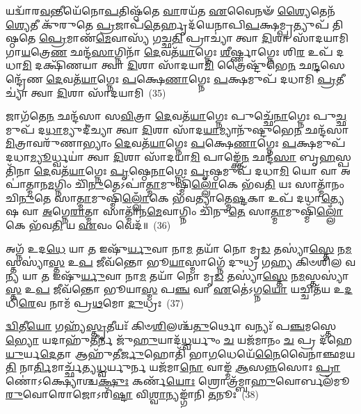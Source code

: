 𑌯𑌦𑍍𑌵𑌾᳴𑌰\-\ul{𑌵}\-𑌨𑍍𑌤𑍀𑌯𑍇᳴𑌨𑍋\-\ul{𑌪}\-𑌤𑌿𑌷𑍍𑌠᳴𑌤𑍇 \ul{𑌵𑌾}\-𑌰𑌯᳴𑌤 \ul{𑌏}\-𑌵𑍈𑌨𑍟᳴ \ul{𑌶𑍍𑌯𑍈}\-𑌤𑍇𑌨᳴ \ul{𑌶𑍍𑌯𑍇}\-𑌤𑍀 𑌕𑍁᳴𑌰𑍁𑌤𑍇 \ul{𑌪𑍍𑌰}\-𑌜𑌾𑌪᳴\-\ul{𑌤𑍇}\-𑌰𑍍\mbox{}𑌹𑍃𑌦᳴𑌯𑍇𑌨𑌾𑌪𑌿\-\ul{𑌪}\-𑌕𑍍𑌷𑌮𑍍𑌪𑍍𑌰𑌤𑍍𑌯𑍁𑌪᳴ 𑌤𑌿𑌷𑍍𑌠𑌤𑍇 \ul{𑌪𑍍𑌰𑍇}\-𑌮𑌾𑌣᳴\-\ul{𑌮𑍇}\-𑌵𑌾𑌸𑍍𑌯᳴ 𑌗𑌚𑍍𑌛\-\ul{𑌤𑌿} 𑌪𑍍𑌰𑌾𑌚𑍍𑌯𑌾॑ 𑌤𑍍𑌵𑌾 \ul{𑌦𑌿}\-𑌶𑌾 𑌸𑌾᳴𑌦𑌯𑌾𑌮𑌿 𑌗𑌾\-\ul{𑌯}\-𑌤𑍍𑌰𑍇\-\ul{𑌣} 𑌛𑌨𑍍𑌦᳴\-\ul{𑌸𑌾}\-𑌗𑍍𑌨𑌿𑌨𑌾᳴ \ul{𑌦𑍇}\-𑌵𑌤᳴\-\ul{𑌯𑌾}\-𑌗𑍍𑌨𑍇𑌃 \ul{𑌶𑍀}\-𑌰𑍍𑌷𑍍𑌣𑌾𑌗𑍍𑌨𑍇𑌃 𑌶𑌿\-\ul{𑌰} 𑌉𑌪᳴ 𑌦𑌧𑌾\-\ul{𑌮𑌿} 𑌦𑌕𑍍𑌷𑌿᳴𑌣𑌯𑌾 𑌤𑍍𑌵𑌾 \ul{𑌦𑌿}\-𑌶𑌾 𑌸𑌾᳴𑌦𑌯𑌾\-\ul{𑌮𑌿} 𑌤𑍍𑌰𑍈𑌷𑍍𑌟𑍁᳴𑌭𑍇\-\ul{𑌨} 𑌛\-\ul{𑌨𑍍𑌦}\-𑌸𑍇𑌨𑍍𑌦𑍍𑌰𑍇᳴𑌣 \ul{𑌦𑍇}\-𑌵𑌤᳴\-\ul{𑌯𑌾}\-𑌗𑍍𑌨𑍇𑌃 \ul{𑌪}\-𑌕𑍍𑌷𑍇\-\ul{𑌣𑌾}\-𑌗𑍍𑌨𑍇𑌃 \ul{𑌪}\-𑌕𑍍𑌷𑌮𑍁𑌪᳴ 𑌦𑌧𑌾𑌮𑌿 \ul{𑌪𑍍𑌰}\-𑌤𑍀𑌚𑍍𑌯𑌾॑ 𑌤𑍍𑌵𑌾 \ul{𑌦𑌿}\-𑌶𑌾 𑌸𑌾᳴𑌦𑌯𑌾𑌮𑌿~(35)

𑌜𑌾𑌗᳴𑌤𑍇\-\ul{𑌨} 𑌛𑌨𑍍𑌦᳴𑌸𑌾 𑌸\-\ul{𑌵𑌿}\-𑌤𑍍𑌰𑌾 \ul{𑌦𑍇}\-𑌵𑌤᳴\-\ul{𑌯𑌾}\-𑌗𑍍𑌨𑍇𑌃 𑌪𑍁𑌚𑍍𑌛𑍇᳴\-\ul{𑌨𑌾}\-𑌗𑍍𑌨𑍇𑌃 𑌪𑍁\-\ul{𑌚𑍍𑌛}\-𑌮𑍁𑌪᳴ 𑌦\-\ul{𑌧𑌾}\-𑌮𑍍𑌯𑍁𑌦𑍀॑𑌚𑍍𑌯𑌾 𑌤𑍍𑌵𑌾 \ul{𑌦𑌿}\-𑌶𑌾 𑌸𑌾᳴𑌦\-\ul{𑌯𑌾}\-𑌮𑍍𑌯𑌾𑌨𑍁᳴𑌷𑍍𑌟𑍁𑌭𑍇\-\ul{𑌨} 𑌛𑌨𑍍𑌦᳴𑌸𑌾 \ul{𑌮𑌿}\-𑌤𑍍𑌰𑌾𑌵𑌰𑍁᳴𑌣𑌾𑌭𑍍𑌯𑌾𑌂 \ul{𑌦𑍇}\-𑌵𑌤᳴\-\ul{𑌯𑌾}\-𑌗𑍍𑌨𑍇𑌃 \ul{𑌪}\-𑌕𑍍𑌷𑍇\-\ul{𑌣𑌾}\-𑌗𑍍𑌨𑍇𑌃 \ul{𑌪}\-𑌕𑍍𑌷𑌮𑍁𑌪᳴ 𑌦𑌧𑌾\-\ul{𑌮𑍍𑌯𑍂}\-𑌰𑍍𑌧𑍍𑌵𑌯𑌾॑ 𑌤𑍍𑌵𑌾 \ul{𑌦𑌿}\-𑌶𑌾 𑌸𑌾᳴𑌦𑌯𑌾\-\ul{𑌮𑌿} 𑌪𑌾𑌙𑍍𑌕𑍍𑌤𑍇᳴\-\ul{𑌨} 𑌛𑌨𑍍𑌦᳴\-\ul{𑌸𑌾} 𑌬𑍃\-\ul{𑌹}\-𑌸𑍍𑌪𑌤𑌿᳴𑌨𑌾 \ul{𑌦𑍇}\-𑌵𑌤᳴\-\ul{𑌯𑌾}\-𑌗𑍍𑌨𑍇𑌃 \ul{𑌪𑍃}\-𑌷𑍍𑌠𑍇\-\ul{𑌨𑌾}\-𑌗𑍍𑌨𑍇𑌃 \ul{𑌪𑍃}\-𑌷𑍍𑌠𑌮𑍁𑌪᳴ 𑌦𑌧𑌾\-\ul{𑌮𑌿} 𑌯𑍋 𑌵𑌾 𑌅𑌪𑌾॑𑌤𑍍𑌮𑌾𑌨\-\ul{𑌮}\-𑌗𑍍𑌨𑌿𑌂 𑌚𑌿᳴\-\ul{𑌨𑍁}\-𑌤𑍇\-𑌽𑌪𑌾॑\-\ul{𑌤𑍍𑌮𑌾}\-𑌮𑍁𑌷𑍍𑌮𑌿᳴\-\ul{𑌲𑍍𑌲𑍋𑌁}\-𑌕𑍇 𑌭᳴𑌵\-\ul{𑌤𑌿} 𑌯𑌃 𑌸𑌾𑌤𑍍𑌮𑌾᳴𑌨𑌂 𑌚𑌿\-\ul{𑌨𑍁}\-𑌤𑍇 𑌸𑌾\-\ul{𑌤𑍍𑌮𑌾}\-𑌮𑍁𑌷𑍍𑌮𑌿᳴\-\ul{𑌲𑍍𑌲𑍋𑌁}\-𑌕𑍇 𑌭᳴𑌵𑌤𑍍𑌯𑌾𑌤𑍍𑌮𑍇\-\ul{𑌷𑍍𑌟}\-𑌕𑌾 𑌉𑌪᳴ 𑌦𑌧𑌾\-\ul{𑌤𑍍𑌯𑍇}\-𑌷 𑌵𑌾 \ul{𑌅}\-𑌗𑍍𑌨𑍇\-\ul{𑌰𑌾}\-𑌤𑍍𑌮𑌾 𑌸𑌾𑌤𑍍𑌮𑌾᳴𑌨\-\ul{𑌮𑍇}\-𑌵𑌾𑌗𑍍𑌨𑌿𑌂 𑌚𑌿᳴𑌨𑍁\-\ul{𑌤𑍇} 𑌸𑌾\-\ul{𑌤𑍍𑌮𑌾}\-𑌮𑍁𑌷𑍍𑌮𑌿᳴\-\ul{𑌲𑍍𑌲𑍋𑌁}\-𑌕𑍇 𑌭᳴𑌵\-\ul{𑌤𑌿} 𑌯 \ul{𑌏}\-𑌵𑌂 𑌵𑍇𑌦᳴॥~(36)

{\anuvakamend[{\-\ul{𑌶𑍍𑌯𑍈}\-\-\ul{𑌤}\-𑌤𑍍𑌵𑌂 \ul{𑌪𑍍𑌰}\-𑌤𑍀𑌚𑍍𑌯𑌾॑ 𑌤𑍍𑌵𑌾 \ul{𑌦𑌿}\-𑌶𑌾 𑌸𑌾᳴𑌦𑌯𑌾\-\ul{𑌮𑌿} 𑌯𑌃 𑌸𑌾𑌤𑍍𑌮𑌾᳴𑌨𑌞𑍍𑌚𑌿\-\ul{𑌨𑍁}\-𑌤𑍇 𑌦𑍍𑌵𑌾𑌵𑌿𑍞᳴𑌶𑌤𑌿𑌶𑍍𑌚}]}%

𑌅𑌗𑍍𑌨᳴ 𑌉𑌦\-\ul{𑌧𑍇} 𑌯𑌾 \ul{𑌤} 𑌇𑌷𑍁᳴\-\ul{𑌰𑍍𑌯𑍁}\-𑌵𑌾 𑌨𑌾\-\ul{𑌮} 𑌤𑌯𑌾᳴ 𑌨𑍋 𑌮𑍃\-\ul{𑌡} 𑌤𑌸𑍍𑌯𑌾॑\-\ul{𑌸𑍍𑌤𑍇} 𑌨\-\ul{𑌮}\-𑌸𑍍𑌤𑌸𑍍𑌯𑌾॑\-\ul{𑌸𑍍𑌤} 𑌉\-\ul{𑌪} 𑌜𑍀𑌵᳴𑌨𑍍𑌤𑍋 𑌭𑍂\-\ul{𑌯𑌾}\-𑌸𑍍𑌮𑌾𑌗𑍍𑌨𑍇᳴ 𑌦𑍁𑌧𑍍𑌰 𑌗𑌹𑍍𑌯 𑌕𑌿𑍞𑌶𑌿𑌲 𑌵\-\ul{𑌨𑍍𑌯} 𑌯𑌾 \ul{𑌤} 𑌇𑌷𑍁᳴\-\ul{𑌰𑍍𑌯𑍁}\-𑌵𑌾 𑌨𑌾\-\ul{𑌮} 𑌤𑌯𑌾᳴ 𑌨𑍋 𑌮𑍃\-\ul{𑌡} 𑌤𑌸𑍍𑌯𑌾॑\-\ul{𑌸𑍍𑌤𑍇} 𑌨\-\ul{𑌮}\-𑌸𑍍𑌤𑌸𑍍𑌯𑌾॑\-\ul{𑌸𑍍𑌤} 𑌉\-\ul{𑌪} 𑌜𑍀𑌵᳴𑌨𑍍𑌤𑍋 𑌭𑍂𑌯𑌾\-\ul{𑌸𑍍𑌮} 𑌪\-\ul{𑌞𑍍𑌚} 𑌵𑌾 \ul{𑌏}\-𑌤𑍇॑\-𑌽𑌗𑍍𑌨\-\ul{𑌯𑍋} 𑌯𑌚𑍍𑌚𑌿𑌤᳴𑌯 𑌉\-\ul{𑌦}\-𑌧𑌿\-\ul{𑌰𑍇}\-𑌵 𑌨𑌾𑌮᳴ 𑌪𑍍𑌰\-\ul{𑌥}\-𑌮𑍋 \ul{𑌦𑍁}\-𑌧𑍍𑌰𑌃~(37)

\-\ul{𑌦𑍍𑌵𑌿}\-𑌤𑍀\-\ul{𑌯𑍋} 𑌗𑌹𑍍𑌯᳴\-\ul{𑌸𑍍𑌤𑍃}\-𑌤𑍀𑌯𑌃᳴ 𑌕𑌿𑍞\-\ul{𑌶𑌿}\-𑌲𑌶𑍍𑌚᳴\-\ul{𑌤𑍁}\-𑌰𑍍𑌥𑍋 𑌵𑌨𑍍𑌯𑌃᳴ 𑌪\-\ul{𑌞𑍍𑌚}\-𑌮𑌸𑍍𑌤𑍇\-\ul{𑌭𑍍𑌯𑍋} 𑌯𑌦𑌾𑌹𑍁᳴\-\ul{𑌤𑍀}\-𑌰𑍍𑌨 𑌜𑍁᳴\-\ul{𑌹𑍁}\-𑌯𑌾𑌦᳴\-\ul{𑌧𑍍𑌵}\-𑌰𑍍𑌯𑍁𑌂 \ul{𑌚} 𑌯𑌜᳴𑌮𑌾𑌨𑌂 \ul{𑌚} 𑌪𑍍𑌰 𑌦᳴𑌹𑍇\-\ul{𑌯𑍁}\-𑌰𑍍𑌯\-\ul{𑌦𑍇}\-𑌤𑌾 𑌆𑌹𑍁᳴𑌤𑍀\-\ul{𑌰𑍍𑌜𑍁}\-𑌹𑍋𑌤𑌿᳴ 𑌭𑌾\-\ul{𑌗}\-𑌧𑍇𑌯𑍇᳴\-\ul{𑌨𑍈}\-𑌵𑍈𑌨𑌾॑𑌞𑍍𑌛𑌮𑌯\-\ul{𑌤𑌿} 𑌨𑌾\-\ul{𑌰𑍍𑌤𑌿}\-𑌮𑌾𑌰𑍍𑌚𑍍𑌛᳴𑌤𑍍𑌯\-\ul{𑌧𑍍𑌵}\-𑌰𑍍𑌯𑍁𑌰𑍍𑌨 𑌯𑌜᳴𑌮𑌾\-\ul{𑌨𑍋} 𑌵𑌾𑌙𑍍𑌮᳴ \ul{𑌆}\-𑌸\-\ul{𑌨𑍍𑌨}\-𑌸𑍋𑌃 \ul{𑌪𑍍𑌰𑌾}\-𑌣𑍋॑\-𑌽𑌕𑍍𑌷𑍍𑌯𑍋𑌶𑍍𑌚\-\ul{𑌕𑍍𑌷𑍁𑌃} 𑌕𑌰𑍍𑌣᳴\-\ul{𑌯𑍋𑌃} 𑌶𑍍𑌰𑍋𑌤𑍍𑌰᳴𑌮𑍍𑌬𑌾\-\ul{𑌹𑍁}\-𑌵𑍋𑌰𑍍𑌬𑌲᳴𑌮𑍂\-\ul{𑌰𑍁}\-𑌵𑍋𑌰𑍋𑌜𑍋\-𑌽𑌰𑌿᳴\-\ul{𑌷𑍍𑌟𑌾} 𑌵𑌿\-\ul{𑌶𑍍𑌵𑌾}\-𑌨𑍍𑌯𑌙𑍍𑌗𑌾᳴𑌨𑌿 \ul{𑌤}\-𑌨𑍂𑌃~(38)

